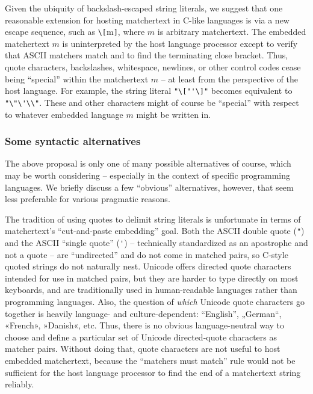 Given the ubiquity of backslash-escaped string literals,
we suggest that one reasonable extension for hosting matchertext
in C-like languages is via a new escape sequence,
such as \verb|\[|m\verb|]|,
where $m$ is arbitrary matchertext.
The embedded matchertext $m$ is uninterpreted by the host language processor
except to verify that ASCII matchers match
and to find the terminating close bracket.
Thus, quote characters, backslashes, whitespace, newlines,
or other control codes cease being ``special'' within the matchertext $m$ --
at least from the perspective of the host language.
For example, the string literal \verb|"\["'\]"|
becomes equivalent to \verb|"\"\'\\"|.
These and other characters might of course be ``special'' with respect to
whatever embedded language $m$ might be written in.

\subsubsection{Some syntactic alternatives}

The above proposal is only one of many possible alternatives of course,
which may be worth considering --
especially in the context of specific programming languages.
We briefly discuss a few ``obvious'' alternatives, however,
that seem less preferable for various pragmatic reasons.

The tradition of using quotes to delimit string literals
is unfortunate in terms of matchertext's ``cut-and-paste embedding'' goal.
Both the ASCII double quote (\verb|"|)
and the ASCII ``single quote'' (\verb|'|) --
technically standardized as an apostrophe and not a quote --
are ``undirected'' and do not come in matched pairs,
so C-style quoted strings do not naturally nest.
Unicode offers directed quote characters
intended for use in matched pairs,
but they are harder to type directly on most keyboards,
and are traditionally used in human-readable languages
rather than programming languages.
Also, the question of \emph{which} Unicode quote characters go together
is heavily language- and culture-dependent:
\eg “English”, „German“, «French», »Danish«, etc.
Thus, there is no obvious language-neutral way to choose and define
a particular set of Unicode directed-quote characters as matcher pairs.
Without doing that,
quote characters are not useful to host embedded matchertext,
because the ``matchers must match'' rule would not be sufficient
for the host language processor
to find the end of a matchertext string reliably.

